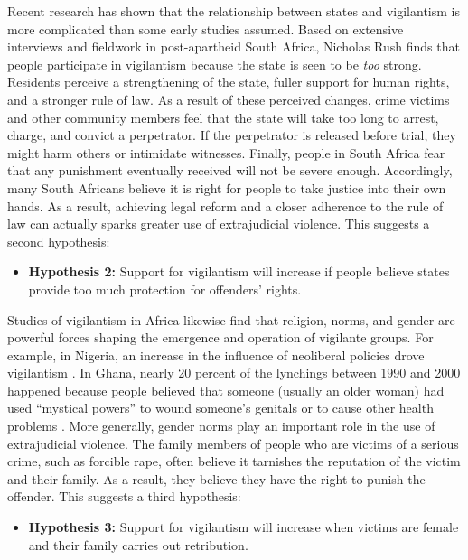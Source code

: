 \documentclass[12pt,ansiapaper]{article}
\begin{document}
Recent research has shown that the relationship between states and vigilantism is more complicated than some early studies assumed. Based on extensive interviews and fieldwork in post-apartheid South Africa, Nicholas Rush \citet{smith2019contradictions} finds that people participate in vigilantism because the state is seen to be \textit{too} strong. Residents perceive a strengthening of the state, fuller support for human rights, and a stronger rule of law. As a result of these perceived changes, crime victims and other community members feel that the state will take too long to arrest, charge, and convict a perpetrator. If the perpetrator is released before trial, they might harm others or intimidate witnesses. Finally, people in South Africa fear that any punishment eventually received will not be severe enough. Accordingly, many South Africans believe it is right for people to take justice into their own hands. As a result, achieving legal reform and a  closer adherence to the rule of law can actually sparks greater use of extrajudicial violence. This suggests a second hypothesis:

\begin{itemize}
  \item \textbf{Hypothesis 2:} Support for vigilantism will increase if people believe states provide too much protection for offenders' rights. 
  \end{itemize}
 
Studies of vigilantism in Africa likewise find that religion, norms, and gender are powerful forces shaping the emergence and operation of vigilante groups. For example, in Nigeria, an increase in the influence of neoliberal policies drove vigilantism \citep[5]{pratten2008politics}. In Ghana, nearly 20 percent of the lynchings between 1990 and 2000 happened because people believed that someone (usually an older woman) had used ``mystical powers'' to wound someone's genitals or to cause other health problems  \citep[414]{adinkrah2005vigilante}. More generally, gender norms play an important role in the use of extrajudicial violence. The family members of people who are victims of a serious crime, such as forcible rape, often believe it tarnishes the reputation of the victim and their family. As a result, they believe they have the right to punish the offender. This suggests a third hypothesis:

\begin{itemize}
  \item \textbf{Hypothesis 3:} Support for vigilantism will increase when victims are female and their family carries out retribution.  
  \end{itemize}
\end{document}
